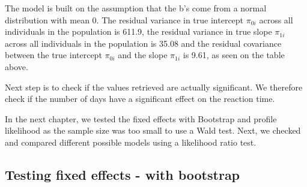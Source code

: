 \documentclass[
]{article}
\begin{document}
The model is built on the assumption that the b's come from a normal
distribution with mean 0. The residual variance in true intercept
\(\pi_{0i}\) across all individuals in the population is 611.9, the
residual variance in true slope \(\pi_{1i}\) across all individuals in
the population is 35.08 and the residual covariance between the true
intercept \(\pi_{0i}\) and the slope \(\pi_{1i}\) is 9.61, as seen on
the table above.

Next step is to check if the values retrieved are actually significant.
We therefore check if the number of days have a significant effect on
the reaction time.

In the next chapter, we tested the fixed effects with Bootstrap and
profile likelihood as the sample size was too small to use a Wald test.
Next, we checked and compared different possible models using a
likelihood ratio test.

\hypertarget{testing-fixed-effects---with-bootstrap}{%
\subsection{Testing fixed effects - with
bootstrap}\label{testing-fixed-effects---with-bootstrap}}
\end{document}
